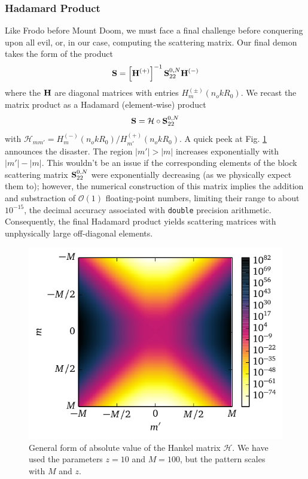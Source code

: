 \subsubsection{Hadamard Product}
Like Frodo before Mount Doom, we must face a final challenge
before conquering upon all evil, or, in our case, computing
the scattering matrix. Our final demon
takes the form of the product
  \begin{equation}
   \mathbf{S} = \left[\mathbf{H}^{(+)}\right]^{-1}\mathbf{S}^{0,N}_{22}\mathbf{H}^{(-)}
  \end{equation}
where the $\mathbf{H}$ are diagonal matrices with entries $H_m^{(\pm)}(n_okR_0)$. 
We recast the matrix product as a Hadamard (element-wise) product
 \begin{equation}
  \mathbf{S} = \mathcal{H}\circ\mathbf{S}^{0,N}_{22}
 \end{equation}
with $\mathcal{H}_{mm'} = H_m^{(-)}(n_okR_0)/H_{m'}^{(+)}(n_okR_0)$.
A quick peek at Fig. \ref{fig:passive.numerical.hankelHadamard} 
announces the disaster. The region $|m'|>|m|$ increases 
exponentially with $|m'|-|m|$. This wouldn't be an issue 
if the corresponding elements of the block scattering
matrix $\mathbf{S}^{0,N}_{22}$ were exponentially decreasing (as
we physically expect them to); however, the numerical construction
of this matrix implies the addition and substraction of $\mathcal{O}(1)$
floating-point numbers, limiting their range to about $10^{-15}$, the decimal
accuracy associated with \texttt{double} precision arithmetic. Consequently, 
the final Hadamard product yields scattering matrices with unphysically
large off-diagonal elements.

\begin{figure}
 \centering
 \includegraphics{figs/passive/absHadamard.pdf}
 \caption[General form of absolute value of the Hankel matrix $\mathcal{H}$]
	 {General form of absolute value of the Hankel matrix $\mathcal{H}$.
	 We have used the parameters $z=10$ and $M=100$, but
	  the pattern scales with $M$ and $z$.}
 \label{fig:passive.numerical.hankelHadamard}
\end{figure}


